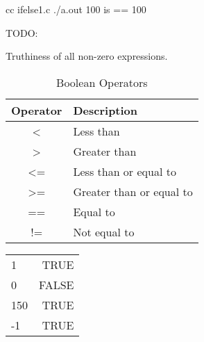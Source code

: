 \begin{Terminal}
cc ifelse1.c
./a.out
100 is == 100
\end{Terminal}


TODO:

Truthiness of all non-zero expressions.

\begin{table}
\centering
\begin{tabular}{|c|l|}
\hline
Operator & Description \\
\hline
\textless & Less than \\
\textgreater & Greater than \\
\textless= & Less than or equal to \\
\textgreater= & Greater than or equal to \\
== & Equal to \\
!= & Not equal to \\
\hline
\end{tabular}
\caption{Boolean Operators}
\end{table}

\begin{tabular}{l | r}
1 & TRUE \\
0 & FALSE \\
150 & TRUE \\
-1 & TRUE
\end{tabular}
